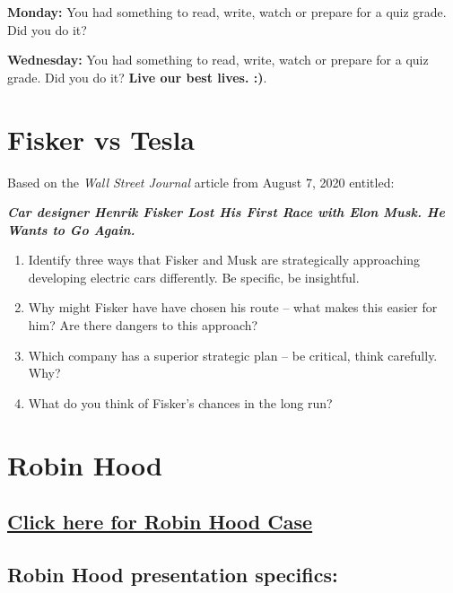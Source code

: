 \documentclass[
]{book}
\providecommand{\tightlist}{%
  \setlength{\itemsep}{0pt}\setlength{\parskip}{0pt}}
\begin{document}
\textbf{Monday:} You had something to read, write, watch or prepare for a quiz grade. Did you do it?

\textbf{Wednesday:} You had something to read, write, watch or prepare for a quiz grade. Did you do it? \textbf{Live our best lives. :)}.

\hypertarget{fisker-vs-tesla}{%
\chapter{Fisker vs Tesla}\label{fisker-vs-tesla}}

Based on the \emph{Wall Street Journal} article from August 7, 2020 entitled:

\textbf{\emph{Car designer Henrik Fisker Lost His First Race with Elon Musk. He Wants to Go Again.}}

\begin{enumerate}
\def\labelenumi{\arabic{enumi}.}
\tightlist
\item
  Identify three ways that Fisker and Musk are strategically approaching developing electric cars differently. Be specific, be insightful.
\item
  Why might Fisker have have chosen his route -- what makes this easier for him? Are there dangers to this approach?
\item
  Which company has a superior strategic plan -- be critical, think carefully. Why?
\item
  What do you think of Fisker's chances in the long run?
\end{enumerate}

\hypertarget{robin-hood}{%
\chapter{Robin Hood}\label{robin-hood}}

\hypertarget{click-here-for-robin-hood-case}{%
\section{\texorpdfstring{\href{https://nanopdf.com/download/robin-hood-case-salem-state-university_pdf}{Click here for Robin Hood Case}}{Click here for Robin Hood Case}}\label{click-here-for-robin-hood-case}}

\hypertarget{robin-hood-presentation-specifics}{%
\section{Robin Hood presentation specifics:}\label{robin-hood-presentation-specifics}}
\end{document}
